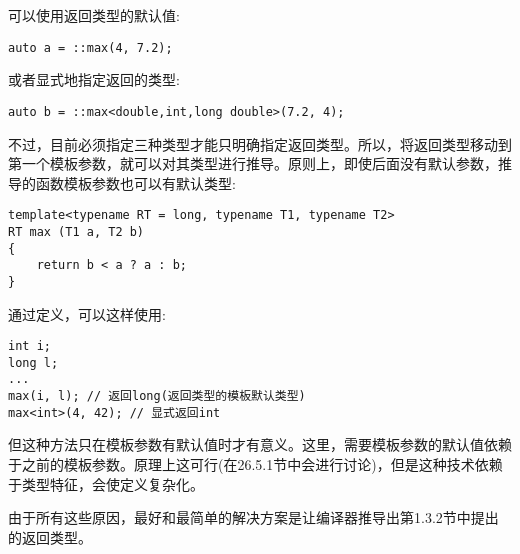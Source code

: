 可以使用返回类型的默认值:

\begin{lstlisting}[style=styleCXX]
auto a = ::max(4, 7.2);
\end{lstlisting}

或者显式地指定返回的类型:

\begin{lstlisting}[style=styleCXX]
auto b = ::max<double,int,long double>(7.2, 4);
\end{lstlisting}

不过，目前必须指定三种类型才能只明确指定返回类型。所以，将返回类型移动到第一个模板参数，就可以对其类型进行推导。原则上，即使后面没有默认参数，推导的函数模板参数也可以有默认类型:

\begin{lstlisting}[style=styleCXX]
template<typename RT = long, typename T1, typename T2>
RT max (T1 a, T2 b)
{
	return b < a ? a : b;
}
\end{lstlisting}

通过定义，可以这样使用:

\begin{lstlisting}[style=styleCXX]
int i;
long l;
...
max(i, l); // 返回long(返回类型的模板默认类型)
max<int>(4, 42); // 显式返回int
\end{lstlisting}

但这种方法只在模板参数有默认值时才有意义。这里，需要模板参数的默认值依赖于之前的模板参数。原理上这可行(在26.5.1节中会进行讨论)，但是这种技术依赖于类型特征，会使定义复杂化。

由于所有这些原因，最好和最简单的解决方案是让编译器推导出第1.3.2节中提出的返回类型。
